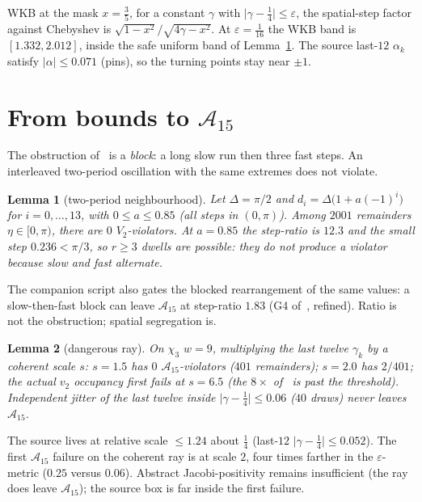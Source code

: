 \documentclass[11pt]{article}
\newtheorem{lemma}{Lemma}
\theoremstyle{remark}
\begin{document}
WKB at the mask $x=\tfrac35$, for a constant $\gamma$ with
$\lvert\gamma-\tfrac14\rvert\le\varepsilon$, the spatial-step
factor against Chebyshev is
$\sqrt{1-x^2}/\sqrt{4\gamma-x^2}$.  At $\varepsilon=\tfrac1{16}$
the WKB band is $[1.332,2.012]$, inside the safe uniform band of
Lemma~\ref{lem:twoperiod}.  The source last-$12$ $\alpha_k$
satisfy $\lvert\alpha\rvert\le 0.071$ (pins), so the turning
points stay near $\pm 1$.

\section{From bounds to $\mathcal{A}_{15}$}\label{sec:a15}

The obstruction of~\cite{v2lem} is a \emph{block}: a long slow
run then three fast steps.  An interleaved two-period
oscillation with the same extremes does not violate.

\begin{lemma}[two-period neighbourhood]\label{lem:twoperiod}
Let $\Delta=\pi/2$ and
$d_i=\Delta\bigl(1+a(-1)^i\bigr)$ for $i=0,\ldots,13$, with
$0\le a\le 0.85$ (all steps in $(0,\pi)$).  Among $2001$
remainders $\eta\in[0,\pi)$, there are $0$ $V_2$-violators.
At $a=0.85$ the step-ratio is $12.3$ and the small step
$0.236<\pi/3$, so $r\ge 3$ dwells are possible: they do not
produce a violator because slow and fast \emph{alternate}.
\end{lemma}

The companion script also gates the blocked rearrangement of
the same values: a slow-then-fast block can leave
$\mathcal{A}_{15}$ at step-ratio $1.83$ (G4 of~\cite{v2lem},
refined).  Ratio is not the obstruction; spatial segregation
is.

\begin{lemma}[dangerous ray]\label{lem:ray}
On $\chi_3$ $w=9$, multiplying the last twelve $\gamma_k$ by a
coherent scale $s$: $s=1.5$ has $0$ $\mathcal{A}_{15}$-violators
($401$ remainders); $s=2.0$ has $2/401$; the actual $v_2$
occupancy first fails at $s=6.5$ (the $8\times$ of~\cite{v2lem}
is past the threshold).  Independent jitter of the last twelve
inside $\lvert\gamma-\tfrac14\rvert\le 0.06$ ($40$ draws) never
leaves $\mathcal{A}_{15}$.
\end{lemma}

The source lives at relative scale $\le 1.24$ about $\tfrac14$
(last-$12$ $\lvert\gamma-\tfrac14\rvert\le 0.052$).  The first
$\mathcal{A}_{15}$ failure on the coherent ray is at scale $2$,
four times farther in the $\varepsilon$-metric
($0.25$ versus $0.06$).  Abstract Jacobi-positivity remains
insufficient (the ray does leave $\mathcal{A}_{15}$); the
source box is far inside the first failure.
\end{document}
